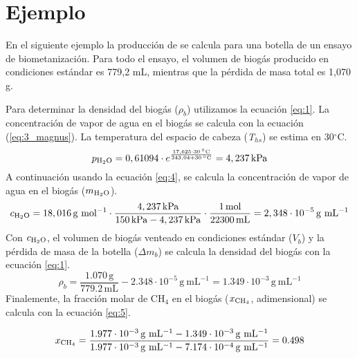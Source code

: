 \documentclass[spanish]{article}
\newcommand{\unit}[1]{\ensuremath{\, \mathrm{#1}}}
\begin{document}
\section{Ejemplo} \label{s_example}
En el siguiente ejemplo la producción de  se calcula para una botella de un ensayo de biometanización. Para todo el ensayo, el volumen de biogás producido en condiciones estándar es 779,2 mL, mientras que la pérdida de masa total es 1,070 g.

Para determinar la densidad del biogás ($\rho_b$) utilizamos la ecuación \ref{eq:1}. La concentración de vapor de agua en el biogás se calcula con la ecuación (\ref{eq:3_magnus}). 
La temperatura del espacio de cabeza (\textit{T}$_{hs}$) se estima en 30$^\circ$C.
\begin{equation*}
  p\textsubscript{H$_2$O} = 0,61094 \cdot e^{\frac{17,625 \cdot 30\unit{^\circ C}}{243,04 + 30 \unit{^\circ C}}} = 4,237 \unit{kPa}
\end{equation*}
A continuación usando la ecuación \ref{eq:4}, se calcula la concentración de vapor de agua en el biogás ($m\textsubscript{H$_2$O}$).
\begin{equation*}
  c\textsubscript{H$_2$O} = 18,016 \unit{g~mol^{-1}} \cdot \frac{4,237 \unit{kPa}}{150 \unit{kPa} - 4,237 \unit{kPa}} \cdot \frac{1 \unit{mol}}{22300 \unit{mL}} = 2,348\cdot10^{-5} \unit{g~mL^{-1}}
\end{equation*}
Con $c\textsubscript{H$_2$O}$, el volumen de biogás venteado en condiciones estándar ($V_{b}$) y la pérdida de masa de la botella ($\Delta m_b$) se calcula la densidad del biogás con la ecuación \ref{eq:1}.
\begin{equation*}
  \rho_b=\frac{1.070 \unit{g}}{779.2 \unit{mL}} - 2.348 \cdot 10^{-5} \unit{g~mL^{-1}} = 1.349 \cdot 10^{-3} \unit{g~mL^{-1}}
\end{equation*}
Finalemente, la fracción molar de CH$_4$ en el biogás ($x\textsubscript{CH$_4$}$, adimensional) se calcula con la ecuación \ref{eq:5}. 

\begin{equation*}
  x\textsubscript{CH$_4$}=\frac{1.977  \cdot 10^{-3} \unit{g~mL^{-1}} - 1.349 \cdot 10^{-3} \unit{g~mL^{-1}}}
  {1.977  \cdot 10^{-3} \unit{g~mL^{-1}} - 7.174 \cdot 10^{-4} \unit{g~mL^{-1}}}
  = 0.498
\end{equation*}


\end{document}
